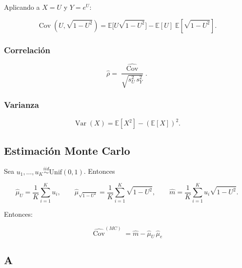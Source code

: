 \documentclass[11pt]{article}
\begin{document}
Aplicando a \(X=U\) y \(Y=e^{U}\):

\[
\operatorname{Cov}(U,\sqrt{1-U^2})=\mathbb{E}\!\big[U \sqrt{1-U^2}]-\mathbb{E}[U]\;\mathbb{E}[\sqrt{1-U^2}].
\]

    \hypertarget{correlaciuxf3n}{%
\subsubsection{Correlación}\label{correlaciuxf3n}}

\[
\widehat\rho=\dfrac{\widehat{\operatorname{Cov}}}{\sqrt{s_U^2\,s_Y^2}}.
\]

    \hypertarget{varianza}{%
\subsubsection{Varianza}\label{varianza}}

\[
\operatorname{Var}(X)=\mathbb{E}[X^{2}]-(\mathbb{E}[X])^{2}.
\]

    \hypertarget{estimaciuxf3n-monte-carlo}{%
\subsection{Estimación Monte Carlo}\label{estimaciuxf3n-monte-carlo}}

Sea \(u_1,\dots,u_K\stackrel{iid}{\sim}\mathrm{Unif}(0,1)\). Entonces

\[
\widehat{\mu}_U=\frac{1}{K}\sum_{i=1}^{K} u_i,\qquad
\widehat{\mu}_{\sqrt{1-U^2}}=\frac{1}{K}\sum_{i=1}^{K} \sqrt{1-U^2},\qquad
\widehat{m}=\frac{1}{K}\sum_{i=1}^{K} u_i \sqrt{1-U^2}.
\]

Entonces:

\[
\;\widehat{\operatorname{Cov}}^{(MC)}=\widehat{m}-\widehat{\mu}_U\,\widehat{\mu}_{e}\;
\]

    \hypertarget{a}{%
\subsection{A}\label{a}}
\end{document}
